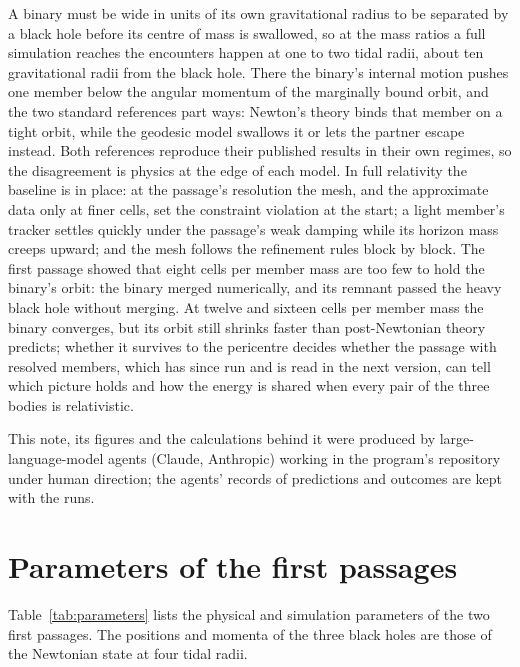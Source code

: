 \documentclass[aps,prd,twocolumn,10pt,superscriptaddress,nofootinbib,longbibliography,floatfix]{revtex4-2}
\begin{document}
A binary must be wide in units of its own gravitational radius to be separated by a black hole before its centre of mass is swallowed, so at the mass ratios a full simulation reaches the encounters happen at one to two tidal radii, about ten gravitational radii from the black hole. There the binary's internal motion pushes one member below the angular momentum of the marginally bound orbit, and the two standard references part ways: Newton's theory binds that member on a tight orbit, while the geodesic model swallows it or lets the partner escape instead. Both references reproduce their published results in their own regimes, so the disagreement is physics at the edge of each model. In full relativity the baseline is in place: at the passage's resolution the mesh, and the approximate data only at finer cells, set the constraint violation at the start; a light member's tracker settles quickly under the passage's weak damping while its horizon mass creeps upward; and the mesh follows the refinement rules block by block. The first passage showed that eight cells per member mass are too few to hold the binary's orbit: the binary merged numerically, and its remnant passed the heavy black hole without merging. At twelve and sixteen cells per member mass the binary converges, but its orbit still shrinks faster than post-Newtonian theory predicts; whether it survives to the pericentre decides whether the passage with resolved members, which has since run and is read in the next version, can tell which picture holds and how the energy is shared when every pair of the three bodies is relativistic.

\begin{acknowledgments}
This note, its figures and the calculations behind it were produced by large-language-model agents (Claude, Anthropic) working in the program's repository under human direction; the agents' records of predictions and outcomes are kept with the runs.
\end{acknowledgments}

\appendix

\section{Parameters of the first passages}\label{app:parameters}

Table~\ref{tab:parameters} lists the physical and simulation parameters of the two first passages. The positions and momenta of the three black holes are those of the Newtonian state at four tidal radii.
\end{document}
